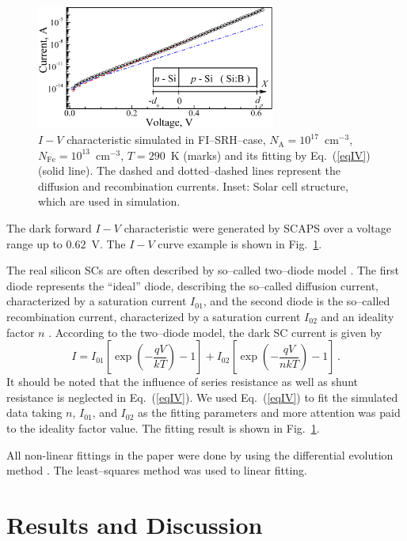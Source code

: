 \documentclass [sort&compress] {elsarticle}
\begin{document}
\begin{figure}
\includegraphics[width=0.7\textwidth]{Fig1}%
\caption{\label{figIV}
$I-V$ characteristic simulated in FI--SRH--case, $N_\mathrm{A}=10^{17}$~cm$^{-3}$,  $N_{\mathrm{Fe}}=10^{13}$~cm$^{-3}$, $T=290$~K (marks)
and its fitting by Eq.~(\ref{eqIV}) (solid line).
The dashed and dotted--dashed lines represent the diffusion and recombination currents.
Inset: Solar cell structure, which are used in simulation.
}%
\end{figure}

The dark forward $I-V$ characteristic were generated by SCAPS over a voltage range up to $0.62$~V.
The $I-V$ curve example is shown in Fig.~\ref{figIV}.

The real silicon SCs are often described by so--called two--diode model \cite{Breitenstein2013}.
The first diode represents the ``ideal'' diode, describing the so--called diffusion current, characterized by a saturation current $I_{01}$,
and the second diode is the so--called recombination current, characterized by a saturation current $I_{02}$ and an ideality factor $n$ \cite{Breitenstein2013}.
According to the two--diode model, the dark SC current is given by
\begin{equation}
\label{eqIV}
    I=I_{01}\left[\exp\left(-\frac{qV}{kT}\right)-1\right]+ I_{02}\left[\exp\left(-\frac{qV}{nkT}\right)-1\right]\,.
\end{equation}
It should be noted that the influence of series resistance as well as shunt resistance is neglected in Eq.~(\ref{eqIV}).
We used Eq.~(\ref{eqIV}) to fit the simulated data taking $n$, $I_{01}$, and $I_{02}$ as the fitting parameters and more attention was paid to the ideality factor value.
The fitting result is shown in Fig.~\ref{figIV}.

All non-linear fittings in the paper were done by using the differential evolution method \cite{DE:Sun,DEWang}.
The least--squares method was used to linear fitting.



\section{Results and Discussion}
\end{document}

